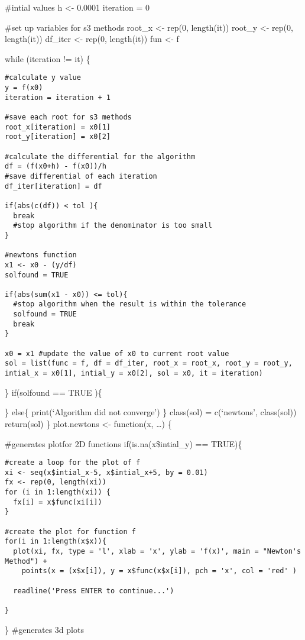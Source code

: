 \documentclass[]{article}
\begin{document}
{{\#intial values h \textless{}- 0.0001 iteration = 0

\#set up variables for s3 methods root\_x \textless{}- rep(0,
length(it)) root\_y \textless{}- rep(0, length(it)) df\_iter
\textless{}- rep(0, length(it)) fun \textless{}- f

while (iteration != it) \{

\begin{verbatim}
#calculate y value
y = f(x0)
iteration = iteration + 1

#save each root for s3 methods
root_x[iteration] = x0[1]
root_y[iteration] = x0[2]

#calculate the differential for the algorithm
df = (f(x0+h) - f(x0))/h
#save differential of each iteration
df_iter[iteration] = df

if(abs(c(df)) < tol ){
  break
  #stop algorithm if the denominator is too small
}

#newtons function
x1 <- x0 - (y/df)
solfound = TRUE

if(abs(sum(x1 - x0)) <= tol){
  #stop algorithm when the result is within the tolerance
  solfound = TRUE
  break
}

x0 = x1 #update the value of x0 to current root value
sol = list(func = f, df = df_iter, root_x = root_x, root_y = root_y, intial_x = x0[1], intial_y = x0[2], sol = x0, it = iteration)
\end{verbatim}

\} if(solfound == TRUE )\{

\} else\{ print(`Algorithm did not converge') \} class(sol) =
c(`newtons', class(sol)) return(sol) \} plot.newtons \textless{}-
function(x, \ldots{}) \{

\#generates plotfor 2D functions if(is.na(x\$intial\_y) == TRUE)\{

\begin{verbatim}
#create a loop for the plot of f
xi <- seq(x$intial_x-5, x$intial_x+5, by = 0.01)
fx <- rep(0, length(xi))
for (i in 1:length(xi)) {
  fx[i] = x$func(xi[i])
}

#create the plot for function f
for(i in 1:length(x$x)){
  plot(xi, fx, type = 'l', xlab = 'x', ylab = 'f(x)', main = "Newton's Method") +
    points(x = (x$x[i]), y = x$func(x$x[i]), pch = 'x', col = 'red' )

  readline('Press ENTER to continue...')

}
\end{verbatim}

\} \#generates 3d plots

}}
\end{document}
